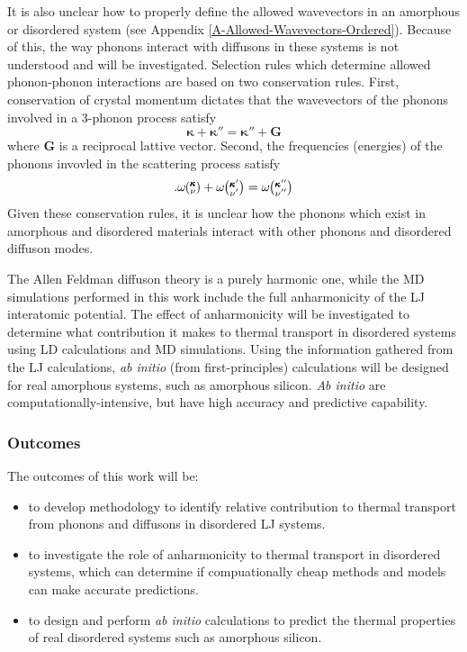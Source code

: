 \documentclass[letterpaper,12pt]{article}
\newcommand{\kv}{\mspace{-4.0mu}\left(\mspace{-8.0mu}\begin{smallmatrix}&\pmb{\kappa} \\&\nu\end{smallmatrix}\mspace{-3.0mu}\right)}
\newcommand{\kvp}{\mspace{-4.0mu}\left(\mspace{-8.0mu}\begin{smallmatrix}&\pmb{\kappa}' \\&\nu'\end{smallmatrix}\mspace{-3.0mu}\right)}
\newcommand{\kvpp}{\mspace{-4.0mu}\left(\mspace{-8.0mu}\begin{smallmatrix}&\pmb{\kappa}'' \\&\nu''\end{smallmatrix}\mspace{-3.0mu}\right)}
\begin{document}
It is also unclear how to properly define the allowed wavevectors in an amorphous or disordered system (see Appendix \ref{A-Allowed-Wavevectors-Ordered}). Because of this, the way phonons interact with diffusons in these systems is not understood and will be investigated. Selection rules which determine allowed phonon-phonon interactions are based on two conservation rules. First, conservation of crystal momentum dictates that the wavevectors of the phonons involved in a 3-phonon process satisfy
\begin{equation}\label{EQ:M:conservation-crys-mom}
\pmb{\kappa} + \pmb{\kappa}'' = \pmb{\kappa}'' + \pmb{G}
\end{equation}
where $\pmb{G}$ is a reciprocal lattive vector.\cite{wallace1972,dove1993} Second, the frequencies (energies) of the phonons invovled in the scattering process satisfy\cite{wallace1972,dove1993}
\begin{equation}\label{EQ:M:conservation-phonon-energy}.
\omega\kv + \omega\kvp = \omega\kvpp 
\end{equation}
Given these conservation rules, it is unclear how the phonons which exist in amorphous and disordered materials interact with other phonons and disordered diffuson modes.

The Allen Feldman diffuson theory is a purely harmonic one, while the MD simulations performed in this work include the full anharmonicity of the LJ interatomic potential. The effect of anharmonicity will be investigated to determine what contribution it makes to thermal transport in disordered systems using LD calculations and MD simulations. Using the information gathered from the LJ calculations, \emph{ab initio} (from first-principles)\cite{baroni2001} calculations will be designed for real amorphous systems, such as amorphous silicon. \emph{Ab initio} are computationally-intensive, but have high accuracy and predictive capability.\cite{baroni2001} 

\subsubsection{\label{S:Resarch-Objectives-1-outcomes}Outcomes}

The outcomes of this work will be:

\begin{itemize}
\item to develop methodology to identify relative contribution to thermal transport from phonons and diffusons in disordered LJ systems.  

\item to investigate the role of anharmonicity to thermal transport in disordered systems, which can determine if compuationally cheap methods and models can make accurate predictions.

\item to design and perform \emph{ab initio} calculations to predict the thermal properties of real disordered systems such as amorphous silicon.
\end{itemize}
\end{document}
